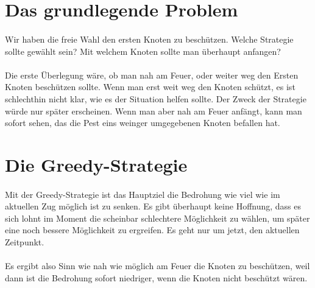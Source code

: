 \documentclass{article}
\begin{document}
	  \section{Das grundlegende Problem}
	  
	  \paragraph {}
	  
	  Wir haben die freie Wahl den ersten Knoten zu beschützen. Welche Strategie sollte gewählt sein? Mit welchem Knoten sollte man überhaupt anfangen?
	  
	  \paragraph{}
	  
	  Die erste Überlegung wäre, ob man nah am Feuer, oder weiter weg den Ersten Knoten beschützen sollte. Wenn man erst weit weg den Knoten schützt, es ist schlechthin nicht klar, wie es der Situation helfen sollte. Der Zweck der Strategie würde nur später erscheinen. Wenn man aber nah am Feuer anfängt, kann man sofort sehen, das die Pest eins weinger umgegebenen Knoten befallen hat.
	  
	  \section{Die Greedy-Strategie}
	  
	  \paragraph{}

	  Mit der Greedy-Strategie ist das Hauptziel die Bedrohung wie viel wie im aktuellen Zug möglich ist zu senken. Es gibt überhaupt keine Hoffnung, dass es sich lohnt im Moment die scheinbar schlechtere Möglichkeit zu wählen, um später eine noch bessere Möglichkeit zu ergreifen. Es geht nur um jetzt, den aktuellen Zeitpunkt. 
	  
	  \paragraph{}
	  
	  Es ergibt also Sinn wie nah wie möglich am Feuer die Knoten zu beschützen, weil dann ist die Bedrohung sofort niedriger, wenn die Knoten nicht beschützt wären.
	
\end{document}
